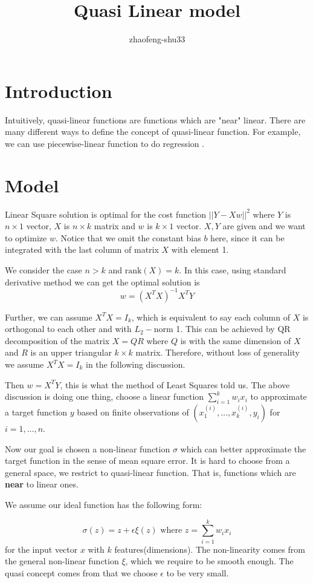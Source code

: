 \documentclass{article}
\title{Quasi Linear model}
\author{zhaofeng-shu33}
\begin{document}
	\maketitle
\section{Introduction}
	Intuitively, quasi-linear functions are functions which are "near" linear.
	There are many different ways to define the concept of quasi-linear function. For example, we can use piecewise-linear function to do regression \cite{qLR}.
	
\section{Model}
Linear Square solution is optimal for the cost function $||Y-Xw||^2$ where $Y$ is $n\times 1$ vector,
$X$ is $n\times k$ matrix and $w$ is $k\times 1$ vector. $X,Y$ are given and we want to optimize $w$.
Notice that we omit the constant bias $b$ here, since it can be integrated with the last column of matrix $X$ with element 1.

We consider the case $n > k$ and $\textrm{rank}(X) = k$. In this case, using standard derivative method we can get
the optimal solution is
$$
w = (X^TX)^{-1} X^T Y
$$

Further, we can assume $X^TX=I_k$, which is equivalent to say each column of $X$ is orthogonal to each other and with $L_2-$norm 1.
This can be achieved by QR decomposition of the matrix $X=QR$ where $Q$ is with the same dimension of $X$ and $R$ is an upper triangular 
$k\times k$ matrix. Therefore, without loss of generality we assume $X^TX=I_k$ in the following discussion.

Then $w=X^T Y$, this is what the method of Least Squares told us. The above discussion is doing one thing, choose a linear function $\sum_{i=1}^k w_i x_i$
to approximate a target function $y$ based on finite observations of $(x^{(i)}_1,\dots, x^{(i)}_k, y_i)$ for $i=1,\dots, n$.

Now our goal is chosen a non-linear function $\sigma$ which can better approximate the target function in the sense of mean square error.
It is hard to choose from a general space, we restrict to quasi-linear function. That is, functions which are \textbf{near} to 
linear ones.

We assume our ideal function has the following form:

$$
\sigma(z) = z + \epsilon \xi(z) \textrm{ where } z = \sum_{i=1}^k w_i x_i
$$
for the input vector $x$ with $k$ features(dimensions).
The non-linearity comes from the general non-linear function $\xi$, which we require to be smooth enough.
The quasi concept comes from that we choose $\epsilon$ to be very small.
\end{document}
